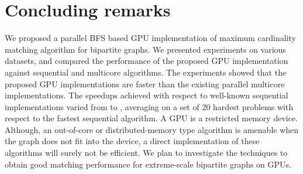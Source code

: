 \documentclass[11pt,a4paper]{article}
\begin{document}
\begin{table}[!htb]
{\begin{tabular}{l|r|r|r|r||r|r|r|r}
\end{tabular}
}
\end{table}


\section{Concluding remarks}\label{sec:con}

We proposed a parallel BFS based GPU implementation of maximum cardinality 
matching algorithm for bipartite graphs. We presented experiments on various 
datasets, and compared the performance of the proposed GPU implementation against sequential and multicore algorithms. The 
experiments showed that the proposed GPU implementations are faster than the 
existing parallel multicore implementations. 
The speedups achieved with respect to well-known sequential implementations varied from  to , averaging  on a set of 20 hardest problems with respect to the fastest sequential algorithm.
A GPU is a restricted memory device. 
Although, an out-of-core or distributed-memory type algorithm is amenable when the graph does not fit into the 
device, a direct implementation of these algorithms will surely not be efficient. 
We plan to investigate the techniques to obtain good matching performance for extreme-scale bipartite graphs on GPUs. 
\end{document}
